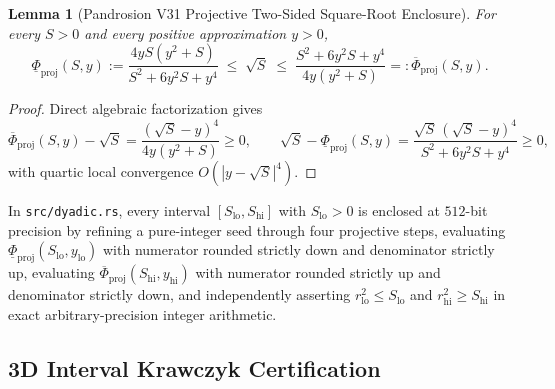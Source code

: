 \documentclass[11pt,a4paper]{amsart}
\newtheorem{lemma}[theorem]{Lemma}
\theoremstyle{definition}
\begin{document}
\begin{lemma}[Pandrosion V31 Projective Two-Sided Square-Root Enclosure]\label{lem:pandrosion}
For every $S > 0$ and every positive approximation $y > 0$,
\begin{equation}\label{eq:pandrosion-sqrt}
  \underline{\Phi}_{\mathrm{proj}}(S, y)
  := \frac{4 y S (y^2 + S)}{S^2 + 6 y^2 S + y^4}
  \;\le\; \sqrt{S} \;\le\;
  \frac{S^2 + 6 y^2 S + y^4}{4 y (y^2 + S)}
  =: \overline{\Phi}_{\mathrm{proj}}(S, y).
\end{equation}
\end{lemma}

\begin{proof}
Direct algebraic factorization gives
\[
  \overline{\Phi}_{\mathrm{proj}}(S, y) - \sqrt{S}
  = \frac{(\sqrt{S} - y)^4}{4 y (y^2 + S)} \ge 0,
  \qquad
  \sqrt{S} - \underline{\Phi}_{\mathrm{proj}}(S, y)
  = \frac{\sqrt{S}\,(\sqrt{S} - y)^4}{S^2 + 6 y^2 S + y^4} \ge 0,
\]
with quartic local convergence $O(|y - \sqrt{S}|^4)$.
\end{proof}

In \texttt{src/dyadic.rs}, every interval $[S_{\mathrm{lo}}, S_{\mathrm{hi}}]$
with $S_{\mathrm{lo}} > 0$ is enclosed at $512$-bit precision by refining a
pure-integer seed through four projective steps, evaluating
$\underline{\Phi}_{\mathrm{proj}}(S_{\mathrm{lo}}, y_{\mathrm{lo}})$ with
numerator rounded strictly down and denominator strictly up, evaluating
$\overline{\Phi}_{\mathrm{proj}}(S_{\mathrm{hi}}, y_{\mathrm{hi}})$ with
numerator rounded strictly up and denominator strictly down, and independently
asserting $r_{\mathrm{lo}}^2 \le S_{\mathrm{lo}}$ and
$r_{\mathrm{hi}}^2 \ge S_{\mathrm{hi}}$ in exact arbitrary-precision integer
arithmetic.

\subsection{3D Interval Krawczyk Certification}
\end{document}
